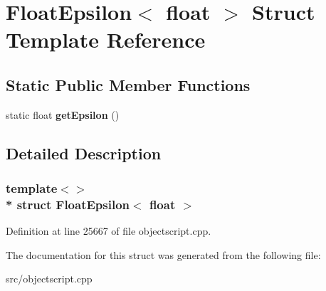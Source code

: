 \hypertarget{struct_float_epsilon_3_01float_01_4}{}\section{Float\+Epsilon$<$ float $>$ Struct Template Reference}
\label{struct_float_epsilon_3_01float_01_4}
\subsection*{Static Public Member Functions}
\begin{DoxyCompactItemize}
\item 
static float {\bfseries get\+Epsilon} ()\hypertarget{struct_float_epsilon_3_01float_01_4_a78479e43401733d22f5c05d20f7d9fb6}{}\label{struct_float_epsilon_3_01float_01_4_a78479e43401733d22f5c05d20f7d9fb6}

\end{DoxyCompactItemize}


\subsection{Detailed Description}
\subsubsection*{template$<$$>$\\*
struct Float\+Epsilon$<$ float $>$}



Definition at line 25667 of file objectscript.\+cpp.



The documentation for this struct was generated from the following file\+:\begin{DoxyCompactItemize}
\item 
src/objectscript.\+cpp\end{DoxyCompactItemize}
